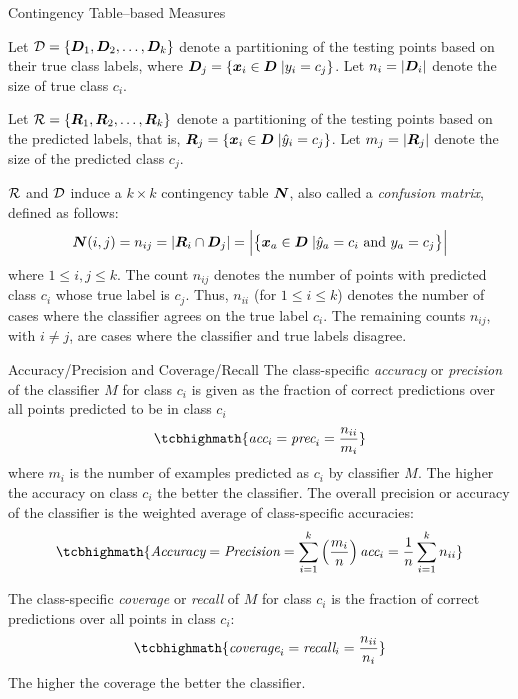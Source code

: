 \begin{frame}{Contingency Table--based Measures}

Let ${\mathcal D} = \{{\boldsymbol D}_1, {\boldsymbol D}_2, \ldots, {\boldsymbol D}_k\}$ denote a partitioning of the
testing points based on their true class labels, where ${\boldsymbol D}_{j} =
\{{\boldsymbol x}_i  \in {\boldsymbol D} \;| y_i = c_{j}\}$.  Let $n_i = |{\boldsymbol D}_i|$ denote the
size of true class $c_i$.

\medskip Let ${\mathcal R} = \{{\boldsymbol R}_1, {\boldsymbol R}_2, \ldots, {\boldsymbol R}_k\}$ denote a
partitioning of the testing points based on the predicted labels, that
is, ${\boldsymbol R}_{j} = \{{\boldsymbol x}_i \in {\boldsymbol D} \;| \hat{y}_i = c_{j}\}$.  Let $m_{j} =
|{\boldsymbol R}_{j}|$ denote the size of the predicted class $c_{j}$.

\medskip
${\mathcal R}$ and ${\mathcal D}$ induce a $k \times k$ contingency table ${\boldsymbol N}$,
also called a {\em confusion matrix},
 
def\/{i}ned as follows:
\begin{align*}
  {\boldsymbol N}(i,j) = n_{ij}  = \left| {\boldsymbol R}_i \cap {\boldsymbol D}_{j} \right| =
\Bigl| \bigl\{ {\boldsymbol x}_a \in {\boldsymbol D} \;| \hat{y}_a = c_i \text{ and } y_a = c_{j}
  \bigr\} \Bigr|
\end{align*}
where $1\le i, j \le k$.
The count $n_{ij}$ denotes the number of points with
predicted class $c_i$ whose true label is $c_{j}$. Thus,
$n_{ii}$ (for $1 \le i \le k$) denotes the number of cases where the
classif\/{i}er agrees on the true label $c_i$. The remaining counts
$n_{ij}$, with $i \ne j$, are cases where the classif\/{i}er and true
labels disagree.
\end{frame}



\begin{frame}{Accuracy/Precision and Coverage/Recall}
\small
The class-specif\/{i}c {\em accuracy} or {\em precision} of the
classif\/{i}er $M$ for class $c_i$ is given as the fraction of correct
predictions over all points predicted to be in class $c_i$
\begin{align*}
\tcbhighmath{
  \textit{acc}_i = \textit{prec}_i = \frac{n_{ii}}{m_{i}}
}
\end{align*}
where $m_i$ is the number of examples predicted as $c_i$ by classif\/{i}er $M$.
The higher the accuracy on class $c_i$ the better the classif\/{i}er.
The overall precision or accuracy of the classif\/{i}er is the
weighted average of class-specif\/{i}c accuracies:
\begin{align*}
\tcbhighmath{
  \textit{Accuracy} = \textit{Precision} = \sum_{i=1}^k \lB(\frac{m_i}{n}\rB) \textit{acc}_i = \frac{1}{n} \sum_{i=1}^k n_{ii}
}
\end{align*}

\medskip
The
class-specif\/{i}c {\em coverage} or {\em recall}  of $M$ for class
$c_i$ is the fraction of correct predictions over all points in
class $c_i$:
\begin{align*}
\tcbhighmath{
  \textit{coverage}_i = \textit{recall}_i = \frac{n_{ii}}{n_{i}}
}
\end{align*}
The higher the coverage the better the classif\/{i}er.
\end{frame}



